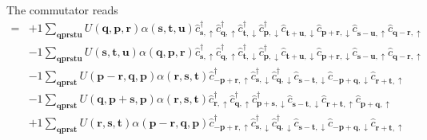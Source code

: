 The commutator reads
\begin{align}
[H, \eta] =	&+1 \sum_{ \mathbf{q} \mathbf{p} \mathbf{r} \mathbf{s} \mathbf{t} \mathbf{u} } U( \mathbf{q}, \mathbf{p}, \mathbf{r} )  \alpha( \mathbf{s}, \mathbf{t}, \mathbf{u} )   \hat{c}_{ \mathbf{s}, \uparrow }^\dagger  \hat{c}_{ \mathbf{q}, \uparrow }^\dagger  \hat{c}_{ \mathbf{t}, \downarrow }^\dagger  \hat{c}_{ \mathbf{p}, \downarrow }^\dagger  \hat{c}_{ \mathbf{t}+\mathbf{u}, \downarrow }^{\phantom{\dagger}} \hat{c}_{ \mathbf{p}+\mathbf{r}, \downarrow }^{\phantom{\dagger}} \hat{c}_{ \mathbf{s}-\mathbf{u}, \uparrow }^{\phantom{\dagger}} \hat{c}_{ \mathbf{q}-\mathbf{r}, \uparrow }^{\phantom{\dagger}}  \\
	&-1 \sum_{ \mathbf{q} \mathbf{p} \mathbf{r} \mathbf{s} \mathbf{t} \mathbf{u} } U( \mathbf{s}, \mathbf{t}, \mathbf{u} )  \alpha( \mathbf{q}, \mathbf{p}, \mathbf{r} )   \hat{c}_{ \mathbf{s}, \uparrow }^\dagger  \hat{c}_{ \mathbf{q}, \uparrow }^\dagger  \hat{c}_{ \mathbf{t}, \downarrow }^\dagger  \hat{c}_{ \mathbf{p}, \downarrow }^\dagger  \hat{c}_{ \mathbf{t}+\mathbf{u}, \downarrow }^{\phantom{\dagger}} \hat{c}_{ \mathbf{p}+\mathbf{r}, \downarrow }^{\phantom{\dagger}} \hat{c}_{ \mathbf{s}-\mathbf{u}, \uparrow }^{\phantom{\dagger}} \hat{c}_{ \mathbf{q}-\mathbf{r}, \uparrow }^{\phantom{\dagger}}  \\
	&-1 \sum_{ \mathbf{q} \mathbf{p} \mathbf{r} \mathbf{s} \mathbf{t} } U( \mathbf{p}-\mathbf{r}, \mathbf{q}, \mathbf{p} )  \alpha( \mathbf{r}, \mathbf{s}, \mathbf{t} )   \hat{c}_{ -\mathbf{p}+\mathbf{r}, \uparrow }^\dagger  \hat{c}_{ \mathbf{s}, \downarrow }^\dagger  \hat{c}_{ \mathbf{q}, \downarrow }^\dagger  \hat{c}_{ \mathbf{s}-\mathbf{t}, \downarrow }^{\phantom{\dagger}} \hat{c}_{ -\mathbf{p}+\mathbf{q}, \downarrow }^{\phantom{\dagger}} \hat{c}_{ \mathbf{r}+\mathbf{t}, \uparrow }^{\phantom{\dagger}}  \\
	&-1 \sum_{ \mathbf{q} \mathbf{p} \mathbf{r} \mathbf{s} \mathbf{t} } U( \mathbf{q}, \mathbf{p}+\mathbf{s}, \mathbf{p} )  \alpha( \mathbf{r}, \mathbf{s}, \mathbf{t} )   \hat{c}_{ \mathbf{r}, \uparrow }^\dagger  \hat{c}_{ \mathbf{q}, \uparrow }^\dagger  \hat{c}_{ \mathbf{p}+\mathbf{s}, \downarrow }^\dagger  \hat{c}_{ \mathbf{s}-\mathbf{t}, \downarrow }^{\phantom{\dagger}} \hat{c}_{ \mathbf{r}+\mathbf{t}, \uparrow }^{\phantom{\dagger}} \hat{c}_{ \mathbf{p}+\mathbf{q}, \uparrow }^{\phantom{\dagger}}  \\
	&+1 \sum_{ \mathbf{q} \mathbf{p} \mathbf{r} \mathbf{s} \mathbf{t} } U( \mathbf{r}, \mathbf{s}, \mathbf{t} )  \alpha( \mathbf{p}-\mathbf{r}, \mathbf{q}, \mathbf{p} )   \hat{c}_{ -\mathbf{p}+\mathbf{r}, \uparrow }^\dagger  \hat{c}_{ \mathbf{s}, \downarrow }^\dagger  \hat{c}_{ \mathbf{q}, \downarrow }^\dagger  \hat{c}_{ \mathbf{s}-\mathbf{t}, \downarrow }^{\phantom{\dagger}} \hat{c}_{ -\mathbf{p}+\mathbf{q}, \downarrow }^{\phantom{\dagger}} \hat{c}_{ \mathbf{r}+\mathbf{t}, \uparrow }^{\phantom{\dagger}}  \\

\end{align}
